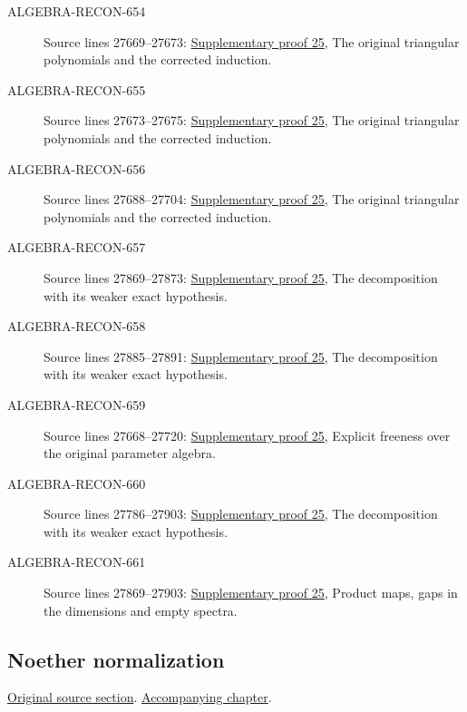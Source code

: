 \begin{description}
\item[ALGEBRA-RECON-654] Source lines 27669--27673: \hyperlink{algebra_affine_dimension_notes_20260928}{Supplementary proof 25}, The original triangular polynomials and the corrected induction.
\item[ALGEBRA-RECON-655] Source lines 27673--27675: \hyperlink{algebra_affine_dimension_notes_20260928}{Supplementary proof 25}, The original triangular polynomials and the corrected induction.
\item[ALGEBRA-RECON-656] Source lines 27688--27704: \hyperlink{algebra_affine_dimension_notes_20260928}{Supplementary proof 25}, The original triangular polynomials and the corrected induction.
\item[ALGEBRA-RECON-657] Source lines 27869--27873: \hyperlink{algebra_affine_dimension_notes_20260928}{Supplementary proof 25}, The decomposition with its weaker exact hypothesis.
\item[ALGEBRA-RECON-658] Source lines 27885--27891: \hyperlink{algebra_affine_dimension_notes_20260928}{Supplementary proof 25}, The decomposition with its weaker exact hypothesis.
\item[ALGEBRA-RECON-659] Source lines 27668--27720: \hyperlink{algebra_affine_dimension_notes_20260928}{Supplementary proof 25}, Explicit freeness over the original parameter algebra.
\item[ALGEBRA-RECON-660] Source lines 27786--27903: \hyperlink{algebra_affine_dimension_notes_20260928}{Supplementary proof 25}, The decomposition with its weaker exact hypothesis.
\item[ALGEBRA-RECON-661] Source lines 27869--27903: \hyperlink{algebra_affine_dimension_notes_20260928}{Supplementary proof 25}, Product maps, gaps in the dimensions and empty spectra.
\end{description}

\subsection{Noether normalization}
\hypertarget{algebra-source-section-Noether-normalization}{}
\noindent\href{https://github.com/stacks/stacks-project/blob/a04446e57ec1fbc252a871afcec7752fb2807b14/algebra.tex\#L27920}{Original source section}. \href{algebra.pdf\#nameddest=section-Noether-normalization}{Accompanying chapter}.

